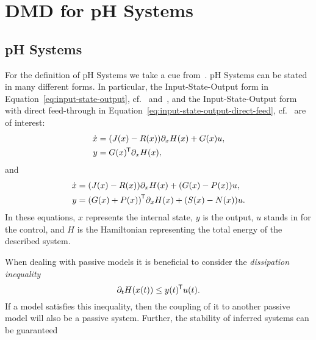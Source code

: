 \section{DMD for pH Systems}

\subsection{pH Systems}

For the definition of pH Systems we take a cue from~\cite{Duindam2009, VanDerSchaft2014, Mehrmann2022}.
pH Systems can be stated in many different forms.
In particular, the Input-State-Output form in Equation~\eqref{eq:input-state-output}, cf.~\cite[Section~2.4]{VanDerSchaft2014} and~\cite[Section~2.2.3]{Duindam2009}, and the Input-State-Output form with direct feed-through in Equation~\eqref{eq:input-state-output-direct-feed}, cf.~\cite[Section~2.2.4]{Duindam2009} are of interest:
\begin{equation}\label{eq:input-state-output}
    \begin{aligned}
        \dot{x} &= (J(x) - R(x)) \partial_x H(x) + G(x) u, \\
        y &= G(x)^{\mkern-1.5mu \mathsf{T}} \partial_x H(x),
    \end{aligned}
\end{equation}
and
\begin{equation}\label{eq:input-state-output-direct-feed}
	\begin{aligned}
        \dot{x} &= (J(x) - R(x)) \partial_x H(x) + (G(x) - P(x)) u , \\
        y &= {(G(x) + P(x))}^{\mkern-1.5mu \mathsf{T}} \partial_x H(x) + (S(x) - N(x)) u.
    \end{aligned}
\end{equation}
In these equations, $x$ represents the internal state, $y$ is the output, $u$ stands in for the control, and $H$ is the Hamiltonian representing the total energy of the described system.

When dealing with passive models it is beneficial to consider the \emph{dissipation inequality}
\begin{equation}
    \partial_t H(x(t)) \leq y(t)^{\mkern-1.5mu \mathsf{T}} u(t).
\end{equation}
If a model satisfies this inequality, then the coupling of it to another passive model will also be a passive system.
Further, the stability of inferred systems can be guaranteed


